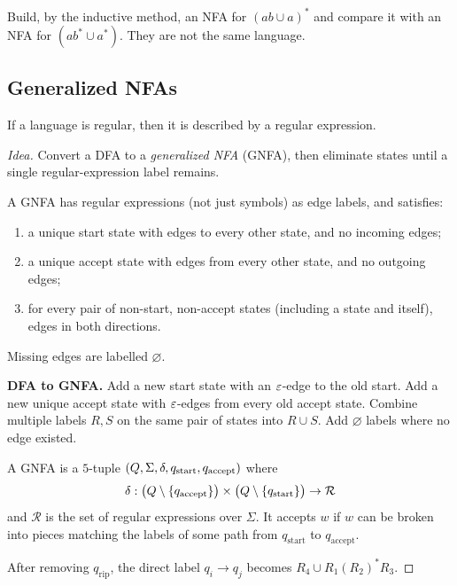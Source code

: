 \begin{exercise}
Build, by the inductive method, an NFA for $(ab\cup a)^*$ and compare it with
an NFA for $(ab^*\cup a^*)$. They are not the same language.
\end{exercise}

\subsection{Generalized NFAs}
\begin{lemma}
If a language is regular, then it is described by a regular expression.
\end{lemma}

\begin{proof}[Idea]
Convert a DFA to a \emph{generalized NFA} (GNFA), then eliminate states until
a single regular-expression label remains.

A GNFA has regular expressions (not just symbols) as edge labels, and satisfies:
\begin{enumerate}
  \item a unique start state with edges to every other state, and no incoming
        edges;
  \item a unique accept state with edges from every other state, and no
        outgoing edges;
  \item for every pair of non-start, non-accept states (including a state and
        itself), edges in both directions.
\end{enumerate}
Missing edges are labelled $\varnothing$.

\textbf{DFA to GNFA.} Add a new start state with an $\varepsilon$-edge to the old
start. Add a new unique accept state with $\varepsilon$-edges from every old accept
state. Combine multiple labels $R,S$ on the same pair of states into
$R\cup S$. Add $\varnothing$ labels where no edge existed.

\begin{definition}[GNFA]
A GNFA is a $5$-tuple $(Q,\Sigma,\delta,q_{\mathrm{start}},q_{\mathrm{accept}})$
where
\[
  \delta:
    \bigl(Q\setminus\{q_{\mathrm{accept}}\}\bigr)
    \times
    \bigl(Q\setminus\{q_{\mathrm{start}}\}\bigr)
    \to \mathcal{R}
\]
and $\mathcal{R}$ is the set of regular expressions over $\Sigma$. It accepts $w$
if $w$ can be broken into pieces matching the labels of some path from
$q_{\mathrm{start}}$ to $q_{\mathrm{accept}}$.
\end{definition}

\begin{center}
\end{center}
After removing $q_{\mathrm{rip}}$, the direct label $q_i\to q_j$ becomes
$R_4\cup R_1(R_2)^*R_3$.


\end{proof}
